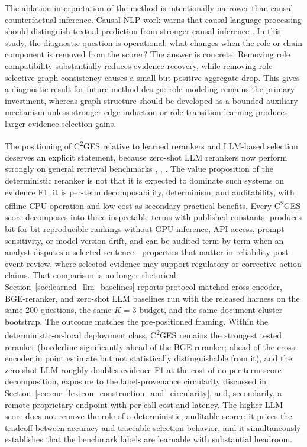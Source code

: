 \documentclass{ieeeaccess}
\begin{document}
The ablation interpretation of the method is intentionally narrower than causal counterfactual inference. Causal NLP work warns that causal language processing should distinguish textual prediction from stronger causal inference \cite{feder2022causal}. In this study, the diagnostic question is operational: what changes when the role or chain component is removed from the scorer? The answer is concrete. Removing role compatibility substantially reduces evidence recovery, while removing role-selective graph consistency causes a small but positive aggregate drop. This gives a diagnostic result for future method design: role modeling remains the primary investment, whereas graph structure should be developed as a bounded auxiliary mechanism unless stronger edge induction or role-transition learning produces larger evidence-selection gains.

The positioning of C\textsuperscript{2}GES relative to learned rerankers and LLM-based selection deserves an explicit statement, because zero-shot LLM rerankers now perform strongly on general retrieval benchmarks \cite{qin2024pairwise}, \cite{zhuang2024setwise}, \cite{ren2025selfcalibrated}. The value proposition of the deterministic reranker is not that it is expected to dominate such systems on evidence F1; it is per-term decomposability, determinism, and auditability, with offline CPU operation and low cost as secondary practical benefits. Every C\textsuperscript{2}GES score decomposes into three inspectable terms with published constants, produces bit-for-bit reproducible rankings without GPU inference, API access, prompt sensitivity, or model-version drift, and can be audited term-by-term when an analyst disputes a selected sentence---properties that matter in reliability post-event review, where selected evidence may support regulatory or corrective-action claims. That comparison is no longer rhetorical: Section~\ref{sec:learned_llm_baselines} reports protocol-matched cross-encoder, BGE-reranker, and zero-shot LLM baselines run with the released harness on the same 200 questions, the same \(K=3\) budget, and the same document-cluster bootstrap. The outcome matches the pre-positioned framing. Within the deterministic-or-local deployment class, C\textsuperscript{2}GES remains the strongest tested reranker (borderline significantly ahead of the BGE reranker; ahead of the cross-encoder in point estimate but not statistically distinguishable from it), and the zero-shot LLM roughly doubles evidence F1 at the cost of no per-term score decomposition, exposure to the label-provenance circularity discussed in Section~\ref{sec:cue_lexicon_construction_and_circularity}, and, secondarily, a remote proprietary endpoint with per-call cost and latency. The higher LLM score does not remove the role of a deterministic, auditable scorer; it prices the tradeoff between accuracy and traceable selection behavior, and it simultaneously establishes that the benchmark labels are learnable with substantial headroom.
\end{document}
